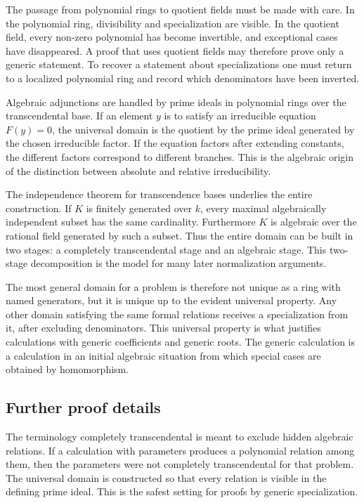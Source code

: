 \documentclass[11pt]{article}
\begin{document}
The passage from polynomial rings to quotient fields must be made with care. In the polynomial ring,
divisibility and specialization are visible. In the quotient field, every non-zero polynomial has
become invertible, and exceptional cases have disappeared. A proof that uses quotient fields may
therefore prove only a generic statement. To recover a statement about specializations one must
return to a localized polynomial ring and record which denominators have been inverted.

Algebraic adjunctions are handled by prime ideals in polynomial rings over the transcendental base.
If an element \(y\) is to satisfy an irreducible equation \(F(y)=0\), the universal domain is the
quotient by the prime ideal generated by the chosen irreducible factor. If the equation factors
after extending constants, the different factors correspond to different branches. This is the
algebraic origin of the distinction between absolute and relative irreducibility.

The independence theorem for transcendence bases underlies the entire construction. If \(K\) is
finitely generated over \(k\), every maximal algebraically independent subset has the same
cardinality. Furthermore \(K\) is algebraic over the rational field generated by such a subset. Thus
the entire domain can be built in two stages: a completely transcendental stage and an algebraic
stage. This two-stage decomposition is the model for many later normalization arguments.

The most general domain for a problem is therefore not unique as a ring with named generators, but
it is unique up to the evident universal property. Any other domain satisfying the same formal
relations receives a specialization from it, after excluding denominators. This universal property
is what justifies calculations with generic coefficients and generic roots. The generic calculation
is a calculation in an initial algebraic situation from which special cases are obtained by
homomorphism.


\subsection{Further proof details}

The terminology completely transcendental is meant to exclude hidden algebraic relations. If a
calculation with parameters produces a polynomial relation among them, then the parameters were not
completely transcendental for that problem. The universal domain is constructed so that every
relation is visible in the defining prime ideal. This is the safest setting for proofs by generic
specialization.
\end{document}

